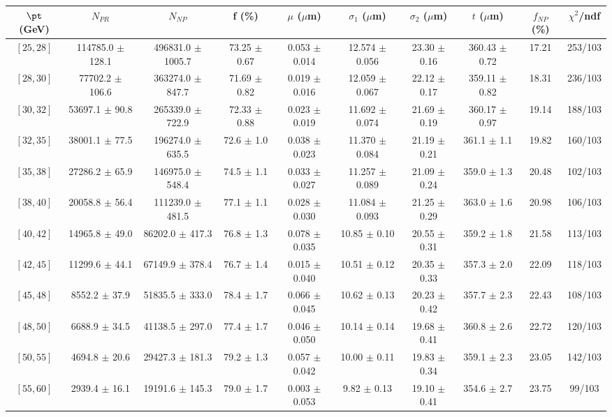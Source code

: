 \begin{tabular}{c||c|c|c|c|c|c|c||c|c}
$\pt$ (GeV) & $N_{PR}$ & $N_{NP}$ & f (\%) & $\mu$ ($\mu$m) & $\sigma_1$ ($\mu$m) & $\sigma_2$ ($\mu$m)  & $t$ ($\mu$m) & $f_{NP}$ (\%) & $\chi^2$/ndf \\
\hline
$[25, 28]$ & 114785.0 $\pm$ 128.1 & 496831.0 $\pm$ 1005.7 & 73.25 $\pm$ 0.67 & 0.053 $\pm$ 0.014 & 12.574 $\pm$ 0.056 & 23.30 $\pm$ 0.16 & 360.43 $\pm$ 0.72 & 17.21 & 253/103\\
$[28, 30]$ & 77702.2 $\pm$ 106.6 & 363274.0 $\pm$ 847.7 & 71.69 $\pm$ 0.82 & 0.019 $\pm$ 0.016 & 12.059 $\pm$ 0.067 & 22.12 $\pm$ 0.17 & 359.11 $\pm$ 0.82 & 18.31 & 236/103\\
$[30, 32]$ & 53697.1 $\pm$ 90.8 & 265339.0 $\pm$ 722.9 & 72.33 $\pm$ 0.88 & 0.023 $\pm$ 0.019 & 11.692 $\pm$ 0.074 & 21.69 $\pm$ 0.19 & 360.17 $\pm$ 0.97 & 19.14 & 188/103\\
$[32, 35]$ & 38001.1 $\pm$ 77.5 & 196274.0 $\pm$ 635.5 & 72.6 $\pm$ 1.0 & 0.038 $\pm$ 0.023 & 11.370 $\pm$ 0.084 & 21.19 $\pm$ 0.21 & 361.1 $\pm$ 1.1 & 19.82 & 160/103\\
$[35, 38]$ & 27286.2 $\pm$ 65.9 & 146975.0 $\pm$ 548.4 & 74.5 $\pm$ 1.1 & 0.033 $\pm$ 0.027 & 11.257 $\pm$ 0.089 & 21.09 $\pm$ 0.24 & 359.0 $\pm$ 1.3 & 20.48 & 102/103\\
$[38, 40]$ & 20058.8 $\pm$ 56.4 & 111239.0 $\pm$ 481.5 & 77.1 $\pm$ 1.1 & 0.028 $\pm$ 0.030 & 11.084 $\pm$ 0.093 & 21.25 $\pm$ 0.29 & 363.0 $\pm$ 1.6 & 20.98 & 106/103\\
$[40, 42]$ & 14965.8 $\pm$ 49.0 & 86202.0 $\pm$ 417.3 & 76.8 $\pm$ 1.3 & 0.078 $\pm$ 0.035 & 10.85 $\pm$ 0.10 & 20.55 $\pm$ 0.31 & 359.2 $\pm$ 1.8 & 21.58 & 113/103\\
$[42, 45]$ & 11299.6 $\pm$ 44.1 & 67149.9 $\pm$ 378.4 & 76.7 $\pm$ 1.4 & 0.015 $\pm$ 0.040 & 10.51 $\pm$ 0.12 & 20.35 $\pm$ 0.33 & 357.3 $\pm$ 2.0 & 22.09 & 118/103\\
$[45, 48]$ & 8552.2 $\pm$ 37.9 & 51835.5 $\pm$ 333.0 & 78.4 $\pm$ 1.7 & 0.066 $\pm$ 0.045 & 10.62 $\pm$ 0.13 & 20.23 $\pm$ 0.42 & 357.7 $\pm$ 2.3 & 22.43 & 108/103\\
$[48, 50]$ & 6688.9 $\pm$ 34.5 & 41138.5 $\pm$ 297.0 & 77.4 $\pm$ 1.7 & 0.046 $\pm$ 0.050 & 10.14 $\pm$ 0.14 & 19.68 $\pm$ 0.41 & 360.8 $\pm$ 2.6 & 22.72 & 120/103\\
$[50, 55]$ & 4694.8 $\pm$ 20.6 & 29427.3 $\pm$ 181.3 & 79.2 $\pm$ 1.3 & 0.057 $\pm$ 0.042 & 10.00 $\pm$ 0.11 & 19.83 $\pm$ 0.34 & 359.1 $\pm$ 2.3 & 23.05 & 142/103\\
$[55, 60]$ & 2939.4 $\pm$ 16.1 & 19191.6 $\pm$ 145.3 & 79.0 $\pm$ 1.7 & 0.003 $\pm$ 0.053 & 9.82 $\pm$ 0.13 & 19.10 $\pm$ 0.41 & 354.6 $\pm$ 2.7 & 23.75 & 99/103\\

\end{tabular}
